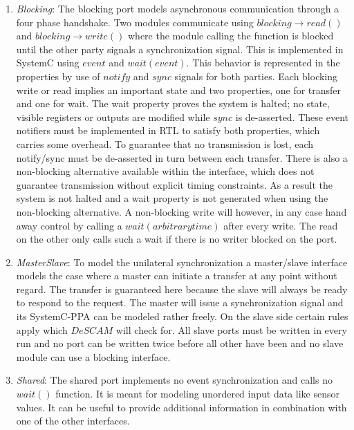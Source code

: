\begin{enumerate}
 \item \textit{Blocking}: The blocking port models asynchronous communication through a four phase handshake. 
 Two modules communicate using $blocking\rightarrow read()$ and $blocking\rightarrow write()$ where the module calling the function is blocked until the other party signals a synchronization signal. 
 This is implemented in SystemC using $event$ and $wait(event)$. This behavior is represented in the properties by use of $notify$ and $sync$ signals for both parties. 
 Each blocking write or read implies an important state and two properties, one for transfer and one for wait. The wait property proves the system is halted; no state, 
 visible registers or outputs are modified while $sync$ is de-asserted. These event notifiers must be implemented in RTL to satisfy both properties, which carries some overhead. 
 To guarantee that no transmission is lost, each notify/sync must be de-asserted in turn between each transfer. There is also a non-blocking alternative available within the interface, 
 which does not guarantee transmission without explicit timing constraints. As a result the system is not halted and a wait property is not generated when using the non-blocking alternative.
  A non-blocking write will however, in any case hand away control by calling a $wait(arbitrary time)$ after every write. The read on the other only calls such a wait if there is no writer blocked on the port.  
 \item \textit{MasterSlave}: To model the unilateral synchronization a master/slave interface models the case where a master can initiate a transfer at any point without regard. The transfer is guaranteed here because the slave will always be ready to respond to the request. The master will issue a synchronization signal and its SystemC-PPA can be modeled rather freely. On the slave side certain rules apply which $DeSCAM$ will check for. All slave ports must be written in every run and no port can be written twice before all other have been and no slave module can use a blocking interface.
 \item \textit{Shared}: The shared port implements no event synchronization and calls no $wait()$ function. It is meant for modeling unordered input data like sensor values. It can be useful to provide additional information in combination with one of the other interfaces.   
\end{enumerate} 

